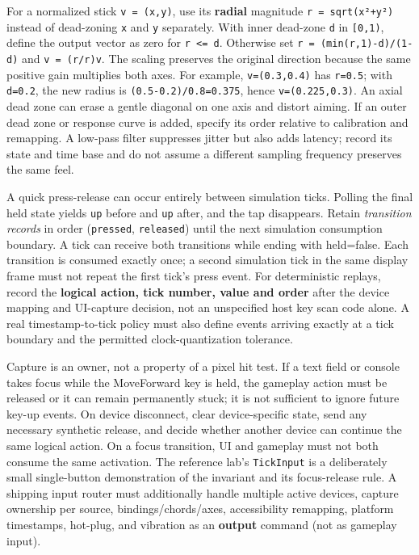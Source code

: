 For a normalized stick \texttt{v\ =\ (x,y)}, use its \textbf{radial} magnitude \texttt{r\ =\ sqrt(x²+y²)} instead of dead-zoning \texttt{x} and \texttt{y} separately. With inner dead-zone \texttt{d} in \texttt{{[}0,1)}, define the output vector as zero for \texttt{r\ \textless{}=\ d}. Otherwise set \texttt{r\textquotesingle{}\ =\ (min(r,1)-d)/(1-d)} and \texttt{v\textquotesingle{}\ =\ (r\textquotesingle{}/r)v}. The scaling preserves the original direction because the same positive gain multiplies both axes. For example, \texttt{v=(0.3,0.4)} has \texttt{r=0.5}; with \texttt{d=0.2}, the new radius is \texttt{(0.5-0.2)/0.8=0.375}, hence \texttt{v\textquotesingle{}=(0.225,0.3)}. An axial dead zone can erase a gentle diagonal on one axis and distort aiming. If an outer dead zone or response curve is added, specify its order relative to calibration and remapping. A low-pass filter suppresses jitter but also adds latency; record its state and time base and do not assume a different sampling frequency preserves the same feel.

A quick press-release can occur entirely between simulation ticks. Polling the final held state yields \texttt{up} before and \texttt{up} after, and the tap disappears. Retain \emph{transition records} in order (\texttt{pressed}, \texttt{released}) until the next simulation consumption boundary. A tick can receive both transitions while ending with held=false. Each transition is consumed exactly once; a second simulation tick in the same display frame must not repeat the first tick's press event. For deterministic replays, record the \textbf{logical action, tick number, value and order} after the device mapping and UI-capture decision, not an unspecified host key scan code alone. A real timestamp-to-tick policy must also define events arriving exactly at a tick boundary and the permitted clock-quantization tolerance.

Capture is an owner, not a property of a pixel hit test. If a text field or console takes focus while the MoveForward key is held, the gameplay action must be released or it can remain permanently stuck; it is not sufficient to ignore future key-up events. On device disconnect, clear device-specific state, send any necessary synthetic release, and decide whether another device can continue the same logical action. On a focus transition, UI and gameplay must not both consume the same activation. The reference lab's \texttt{TickInput} is a deliberately small single-button demonstration of the invariant and its focus-release rule. A shipping input router must additionally handle multiple active devices, capture ownership per source, bindings/chords/axes, accessibility remapping, platform timestamps, hot-plug, and vibration as an \textbf{output} command (not as gameplay input).

